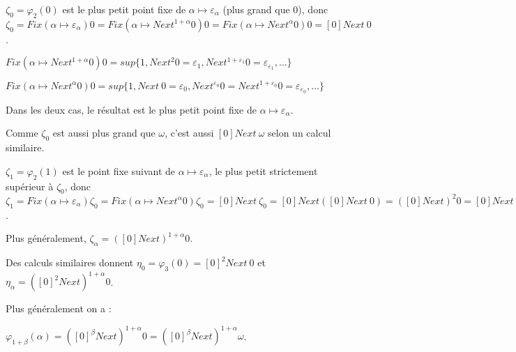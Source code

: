 \documentclass[12pt]{beamer}
\begin{document}
\begin{frame}

\small 

\( \zeta_0 = \varphi_2(0) \) est le plus petit point fixe de \( \alpha \mapsto \varepsilon_\alpha \) (plus grand que 0), donc \( \zeta_0 = Fix (\alpha \mapsto \varepsilon_\alpha) 0 = Fix (\alpha \mapsto Next^{1+\alpha} 0) 0 = Fix (\alpha \mapsto Next^\alpha 0) 0 = [0] Next\ 0 \). 

\( Fix (\alpha \mapsto Next^{1+\alpha} 0) 0 = sup \lbrace 1, Next^2 0 = \varepsilon_1, Next^{1+\varepsilon_1} 0 = \varepsilon_{\varepsilon_1}, \ldots \rbrace \)

\( Fix (\alpha \mapsto Next^\alpha 0) 0 = sup \lbrace 1, Next\ 0 = \varepsilon_0, Next^{\varepsilon_0} 0 = Next^{1+\varepsilon_0} 0 = \varepsilon_{\varepsilon_0}, \ldots \rbrace \) 

Dans les deux cas, le résultat est le plus petit point fixe de \( \alpha \mapsto \varepsilon_\alpha \).

Comme \( \zeta_0 \) est aussi plus grand que \( \omega \), c'est aussi \( [0] Next\ \omega \) selon un calcul similaire.

\( \zeta_1 = \varphi_2(1) \) est le point fixe suivant de \( \alpha \mapsto \varepsilon_\alpha \), le plus petit strictement supérieur à \( \zeta_0 \), donc \( \zeta_1 = Fix (\alpha \mapsto \varepsilon_\alpha) \zeta_0 = Fix (\alpha \mapsto Next^\alpha 0) \zeta_0 = [0] Next\ \zeta_0 = [0] Next ([0] Next\ 0) = ([0] Next)^2 0 = [0] Next ([0] Next\ \omega) = ([0] Next)^2 \omega \).

Plus généralement, \( \zeta_\alpha = ([0] Next)^{1+\alpha} 0 \).

\medskip

Des calculs similaires donnent \( \eta_0 = \varphi_3(0) = [0]^2 Next\ 0 \) et \( \eta_\alpha = ([0]^2 Next)^{1+\alpha} 0 \).

Plus généralement on a :

\small
 
\( \varphi_{1+\beta}(\alpha) = ([0]^\beta Next)^{1+\alpha} 0 = ([0]^\beta Next)^{1+\alpha} \omega \).


\end{frame}
\end{document}
